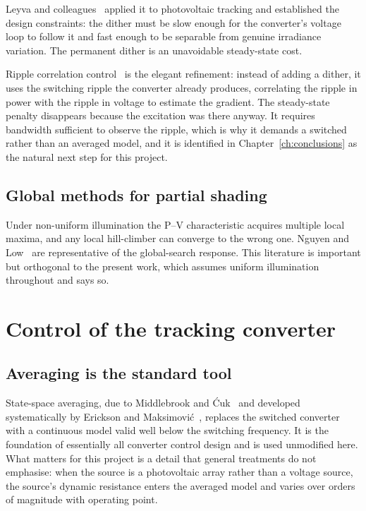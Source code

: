 Leyva and colleagues~\cite{leyva} applied it to photovoltaic tracking and
established the design constraints: the dither must be slow enough for the
converter's voltage loop to follow it and fast enough to be separable from
genuine irradiance variation. The permanent dither is an unavoidable
steady-state cost.

Ripple correlation control~\cite{rcc} is the elegant refinement: instead of
adding a dither, it uses the switching ripple the converter already produces,
correlating the ripple in power with the ripple in voltage to estimate the
gradient. The steady-state penalty disappears because the excitation was there
anyway. It requires bandwidth sufficient to observe the ripple, which is why it
demands a switched rather than an averaged model, and it is identified in
Chapter~\ref{ch:conclusions} as the natural next step for this project.

\subsection{Global methods for partial shading}

Under non-uniform illumination the P--V characteristic acquires multiple local
maxima, and any local hill-climber can converge to the wrong one. Nguyen and
Low~\cite{nguyen} are representative of the global-search response. This
literature is important but orthogonal to the present work, which assumes
uniform illumination throughout and says so.

\section{Control of the tracking converter}

\subsection{Averaging is the standard tool}

State-space averaging, due to Middlebrook and \'{C}uk~\cite{middlebrook} and
developed systematically by Erickson and Maksimovi\'{c}~\cite{erickson},
replaces the switched converter with a continuous model valid well below the
switching frequency. It is the foundation of essentially all converter control
design and is used unmodified here. What matters for this project is a detail
that general treatments do not emphasise: when the source is a photovoltaic
array rather than a voltage source, the source's dynamic resistance enters the
averaged model and varies over orders of magnitude with operating point.

